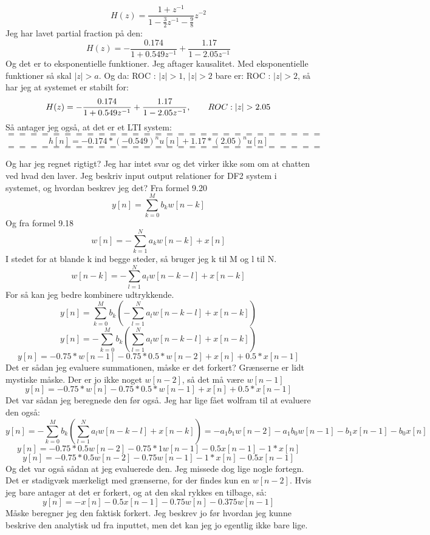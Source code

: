 \begin{Opgaver}
\begin{kapitel}
\begin{Opgave}[Opgave 9.28]
\begin{UnderOpgave}
                \[H(z) = \frac{1 + z^{-1}}{1 - \frac{3}{2}z^{-1} -\frac{9}{8}}z^{-2}\]
                Jeg har lavet partial fraction på den: 
                \[H(z) = -\frac{0.174}{1 + 0.549z^{-1}} + \frac{1.17}{1 - 2.05z^{-1}}\]
                Og det er to eksponentielle funktioner. 
                Jeg aftager kausalitet. Med eksponentielle funktioner så skal $|z| > a$.
                Og da: 
                ROC : $|z| > 1$, $|z| > 2$
                bare er: 
                ROC : $|z| > 2$, så har jeg at systemet er stabilt for: 
                \[H(z) = -\frac{0.174}{1 + 0.549z^{-1}} + \frac{1.17}{1 - 2.05z^{-1}}, \tab{1} ROC : |z| > 2.05\]
                Så antager jeg også, at det er et LTI system: 
                \[============================\]
                \[h[n] = -0.174 * (-0.549)^nu[n] + 1.17 * (2.05)^nu[n]\]
                \[============================\]
            \end{UnderOpgave}
            Og har jeg regnet rigtigt? Jeg har intet svar og det virker ikke som om at chatten ved hvad den laver. 
            Jeg beskriv input output relationer for DF2 system i systemet, og hvordan beskrev jeg det?
            Fra formel 9.20 
            \[y[n]=\sum_{k=0}^{M}b_{k}w[n-k]\]
            Og fra formel 9.18
            \[w[n]=-\sum_{k=1}^{N}a_{k}w[n-k]+x[n]\]
            I stedet for at blande k ind begge steder, så bruger jeg k til M og l til N. 
            \[w[n - k]=-\sum_{l=1}^{N}a_{l}w[n - k - l]+x[n - k]\]
            For så kan jeg bedre kombinere udtrykkende.
            \[y[n]=\sum_{k=0}^{M}b_{k}(-\sum_{l=1}^{N}a_{l}w[n - k - l]+x[n - k])\]
            \[y[n]= - \sum_{k=0}^{M}b_{k}(\sum_{l=1}^{N}a_{l}w[n - k - l]+x[n - k])\]
            \[y[n]= - 0.75 * w[n - 1] - 0.75 * 0.5 * w[n - 2] + x[n] + 0.5*x[n - 1]\]
            Det er sådan jeg evaluere summationen, måske er det forkert? Grænserne er lidt mystiske måske. Der er jo ikke noget $w[n - 2]$, så det må være $w[n - 1]$
            \[y[n]= - 0.75 * w[n] - 0.75 * 0.5 * w[n - 1] + x[n] + 0.5*x[n - 1]\]
            Det var sådan jeg beregnede den før også.
            Jeg har lige fået wolfram til at evaluere den også: 
            \[y[n] = - \sum_{k=0}^{M}b_{k}(\sum_{l=1}^{N}a_{l}w[n - k - l]+x[n - k]) = -a_1b_1w[n - 2] - a_1b_0w[n - 1] - b_1x[n - 1] - b_0x[n]\]
            \[y[n] = -0.75*0.5w[n - 2] - 0.75*1w[n - 1] - 0.5x[n - 1] - 1 * x[n]\]
            \[y[n] = -0.75*0.5w[n - 2] - 0.75w[n - 1] - 1 * x[n] - 0.5x[n - 1]\]
            Og det var også sådan at jeg evaluerede den. Jeg missede dog lige nogle fortegn. 
            Det er stadigvæk mærkeligt med grænserne, for der findes kun en $w[n - 2]$. Hvis jeg bare antager at det er forkert, og at den skal rykkes en tilbage, så: 
            \[y[n] = - x[n] - 0.5x[n - 1] - 0.75w[n] - 0.375w[n - 1]\]
            Måske beregner jeg den faktisk forkert. Jeg beskrev jo før hvordan jeg kunne beskrive den analytisk ud fra inputtet, men det kan jeg jo egentlig ikke bare lige. 
            



\end{Opgave}
\end{kapitel}
\end{Opgaver}
